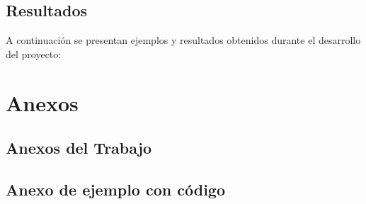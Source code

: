 \documentclass[a4paper,12pt]{article}
\begin{document}
\subsection{Resultados}
A continuación se presentan ejemplos y resultados obtenidos durante el desarrollo del proyecto:

\cite{000}

\printbibliography
\appendix
\section{Anexos}
\subsection{Anexos del Trabajo}
\subsection{Anexo de ejemplo con código}
\end{document}
